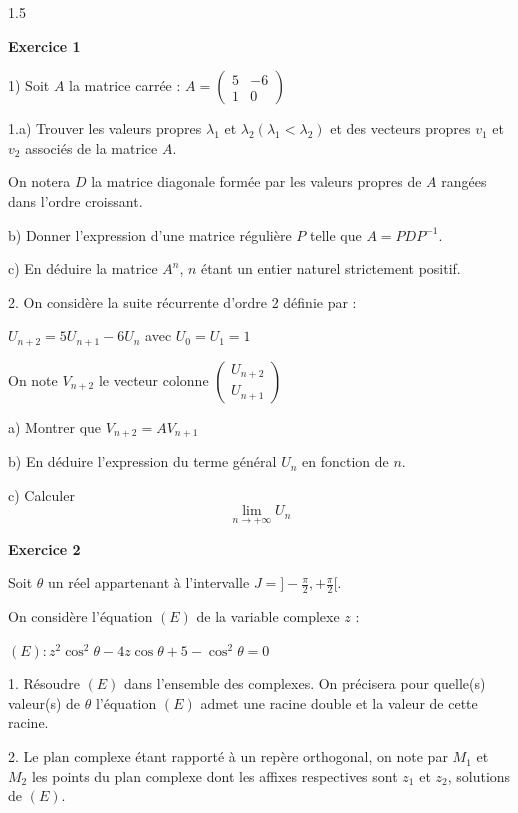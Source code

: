 \documentclass[12pt]{article}
\begin{document}
\begin{spacing}{1.5}

 
 \textbf{Exercice 1}
 
 1) Soit $A$ la matrice carrée : 
$A = \begin{pmatrix}
5 & -6 \\
1 & 0
\end{pmatrix}$

 1.a) Trouver les valeurs propres $\lambda_1$ et $\lambda_2 (\lambda_1 < \lambda_2)$ et des vecteurs propres $v_1$ et $v_2$ associés de la matrice $A$.  

On notera $D$ la matrice diagonale formée par les valeurs propres de $A$ rangées dans 
l'ordre croissant. 

b) Donner l'expression d'une matrice régulière $P$ telle que $A = PDP^{-1}$.

c) En déduire la matrice $A^n$, $n$ étant un entier naturel strictement positif. 

2. On considère la suite récurrente d'ordre 2 définie par : 

$U_{n+2} = 5U_{n+1}-6U_n$
avec $U_0 = U_1 = 1$

On note $V_{n+2}$ le vecteur colonne $\begin{pmatrix}
U_{n+2} \\ 
U_{n+1}
\end{pmatrix} $

a) Montrer que $V_{n+2} = AV_{n+1}$

b) En déduire l'expression du terme général $U_n$ en fonction de $n$. 

c) Calculer \[\lim_{n\longrightarrow +\infty}U_n\]
 
\medskip\textbf{Exercice 2}
 
 Soit $\theta$ un réel appartenant à l'intervalle $J = ]-\frac{\pi}{2}, + \frac{\pi}{2}[$. 

On considère l'équation $(E)$ de la variable complexe $z$ : 

$(E): z^2\cos^2\theta-4z\cos\theta + 5 - \cos^2\theta = 0$ 

1. Résoudre $(E)$ dans l'ensemble des complexes. On précisera pour quelle(s) valeur(s) de $\theta$ l'équation $(E)$ admet une racine double et la valeur de cette racine. 

2. Le plan complexe étant rapporté à un repère orthogonal, on note par $M_1$ et $M_2$ les 
points du plan complexe dont les affixes respectives sont $z_1$ et $z_2$, solutions de $(E)$. 


\end{spacing}
\end{document}
